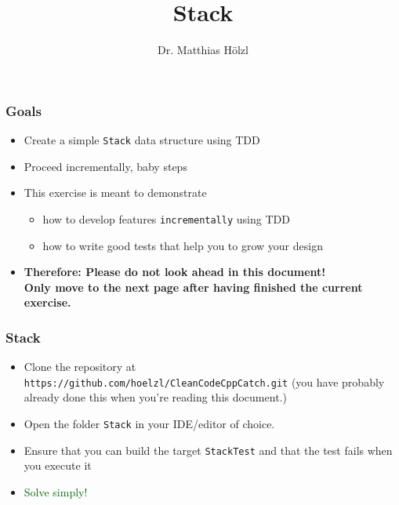 \documentclass[10pt,aspectratio=169]{beamer}
\begin{document}
\title[Stack]{%
  Stack}
\author{Dr. Matthias Hölzl}

\begin{frame}
  \maketitle
\end{frame}

\begin{frame}[fragile]
  \frametitle{Goals}
  \begin{itemize}
  \item Create a simple \texttt{Stack} data structure using TDD
  \item Proceed incrementally, baby steps\\[1ex]
  
  \item This exercise is meant to demonstrate
    \begin{itemize}
    \item how to develop features \texttt{incrementally} using TDD
    \item how to write good tests that help you to grow your design 
    \end{itemize}
  \item \textbf{Therefore: Please do not look ahead in this document!\\
      Only move to the next page after having finished the current
      exercise.}
  \end{itemize}
\end{frame}


\begin{frame}[fragile]
  \frametitle{Stack}
  \begin{itemize}
  \item Clone the repository at
    \texttt{https://github.com/hoelzl/CleanCodeCppCatch.git} (you have probably
    already done this when you're reading this document.)
  \item Open the folder \texttt{Stack} in your IDE/editor of choice.
  \item Ensure that you can build the target \texttt{StackTest} and
    that the test fails when you execute it
  \end{itemize}
  \bigskip
  \begin{itemize}
  \item \textcolor{darkgreen}{Solve simply!}
  \end{itemize}
\end{frame}
\end{document}
